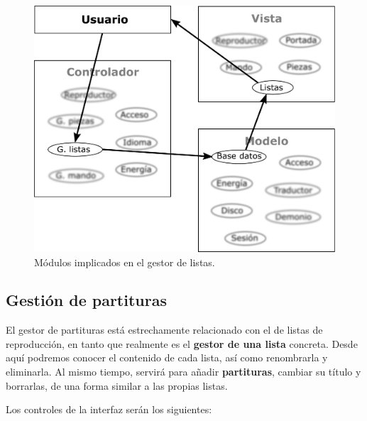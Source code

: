 \begin{figure}[H]
	\noindent \begin{centering}
		\includegraphics[width=\linewidth/2]{capitulo4/mvc_listas}
		\par\end{centering}
	\smallskip
	\caption{\label{fig:mvc_listas} Módulos implicados en el gestor de listas.}
\end{figure} 

\smallskip

\subsection{Gestión de partituras}
\label{subsec:piezas}

El gestor de partituras está estrechamente relacionado con el de listas de reproducción, en tanto que realmente es el \textbf{gestor de una lista} concreta. Desde aquí podremos conocer el contenido de cada lista, así como renombrarla y eliminarla. Al mismo tiempo, servirá para añadir \textbf{partituras}, cambiar su título y borrarlas, de una forma similar a las propias listas.

Los controles de la interfaz serán los siguientes:

